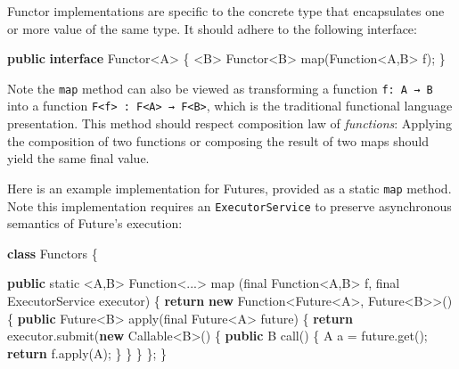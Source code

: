 \documentclass[11pt,]{article}
\newenvironment{Shaded}{}{}
\newcommand{\KeywordTok}[1]{\textcolor[rgb]{0.00,0.44,0.13}{\textbf{{#1}}}}
\newcommand{\DataTypeTok}[1]{\textcolor[rgb]{0.56,0.13,0.00}{{#1}}}
\newcommand{\FunctionTok}[1]{\textcolor[rgb]{0.02,0.16,0.49}{{#1}}}
\newcommand{\NormalTok}[1]{{#1}}
\begin{document}
Functor implementations are specific to the concrete type that
encapsulates one or more value of the same type. It should adhere to the
following interface:

\begin{Shaded}
\begin{Highlighting}[]
\KeywordTok{public} \KeywordTok{interface} \NormalTok{Functor<A> \{}
  \NormalTok{<B> Functor<B> }\FunctionTok{map}\NormalTok{(Function<A,B> f);}
\NormalTok{\}}
\end{Highlighting}
\end{Shaded}

Note the \texttt{map} method can also be viewed as transforming a
function \texttt{f: A → B} into a function
\texttt{F\textless{}f\textgreater{} : F\textless{}A\textgreater{} → F\textless{}B\textgreater{}},
which is the traditional functional language presentation. This method
should respect composition law of \emph{functions}: Applying the
composition of two functions or composing the result of two maps should
yield the same final value.

Here is an example implementation for Futures, provided as a static
\texttt{map} method. Note this implementation requires an
\texttt{ExecutorService} to preserve asynchronous semantics of Future's
execution:

\begin{Shaded}
\begin{Highlighting}[]
\KeywordTok{class} \NormalTok{Functors \{}

  \KeywordTok{public} \DataTypeTok{static} \NormalTok{<A,B> Function<...> }\FunctionTok{map} \NormalTok{(}\DataTypeTok{final} \NormalTok{Function<A,B> f, }
                                         \DataTypeTok{final} \NormalTok{ExecutorService executor) \{}
     \KeywordTok{return} \KeywordTok{new} \NormalTok{Function<Future<A>, Future<B>>() \{}
        \KeywordTok{public} \NormalTok{Future<B> }\FunctionTok{apply}\NormalTok{(}\DataTypeTok{final} \NormalTok{Future<A> future) \{}
          \KeywordTok{return} \NormalTok{executor.}\FunctionTok{submit}\NormalTok{(}\KeywordTok{new} \NormalTok{Callable<B>() \{}
               \KeywordTok{public} \NormalTok{B }\FunctionTok{call}\NormalTok{() \{}
                 \NormalTok{A a = future.}\FunctionTok{get}\NormalTok{();}
                 \KeywordTok{return} \NormalTok{f.}\FunctionTok{apply}\NormalTok{(A);}
               \NormalTok{\}}
            \NormalTok{\}}
        \NormalTok{\}}
     \NormalTok{\};}
  \NormalTok{\}}
\end{Highlighting}
\end{Shaded}
\end{document}
